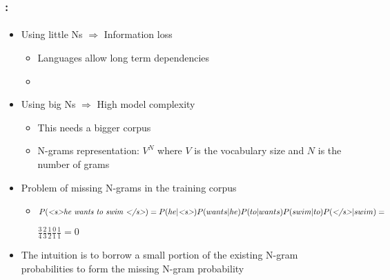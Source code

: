\documentclass[xcolor=table]{beamer}
\begin{document}
\begin{frame}
	\frametitle{\insertshortsubtitle: \insertsection}
	\framesubtitle{\insertsubsection}

	\begin{itemize}
		
		\item Using little Ns $ \Longrightarrow $ Information loss
		\begin{itemize}
			\item Languages allow long term dependencies
			\item {}
		\end{itemize}
	
		\item Using big Ns $ \Longrightarrow $ High model complexity
		\begin{itemize}
			\item This needs a bigger corpus
			\item N-grams representation: $V^N$ where $V$ is the vocabulary size and $N$ is the number of grams
		\end{itemize}
	
		\item Problem of missing N-grams in the training corpus
		\begin{itemize}
			\item $P(\text{\textit{\textless s\textgreater he wants to swim \textless/s\textgreater}}) = 
			P(he|\text{\textit{\textless s\textgreater}}) P(wants|he) P(to|wants) P(swim|to)  P(\text{\textit{\textless/s\textgreater}}|swim) = $
			
			$\frac{3}{4} \frac{2}{3} \frac{1}{2} \frac{0}{1} \frac{1}{1} = 0$
		\end{itemize}
		\item The intuition is to borrow a small portion of the existing N-gram probabilities to form the missing N-gram probability
	\end{itemize}

\end{frame}
\end{document}
